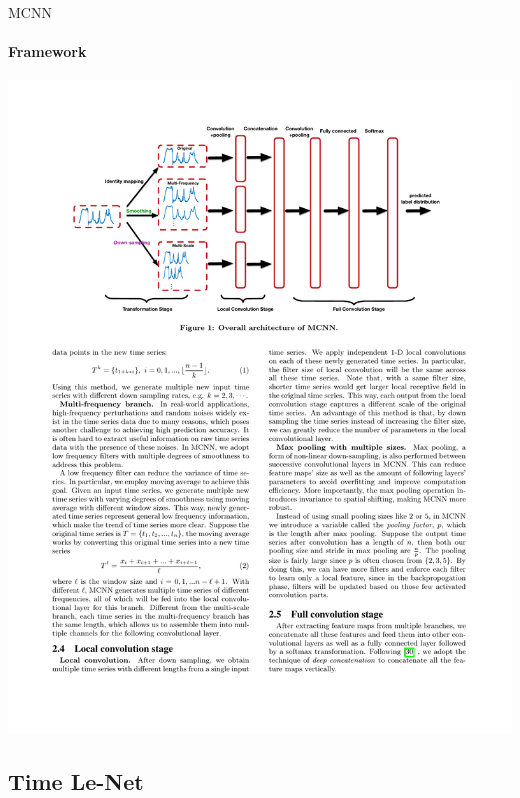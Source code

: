 \documentclass[aspectratio=169]{ctexbeamer}
\begin{document}
\begin{frame}{MCNN}
	\framesubtitle{Framework}
	\begin{center}
		\includegraphics[width=.95\textwidth]{figure/mcnn}
	\end{center}
\end{frame}

\subsection{Time Le-Net}
\end{document}
